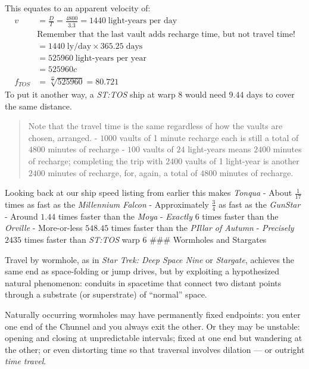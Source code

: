 \documentclass[
  letterpaper,
]{book}
\begin{document}
This equates to an apparent velocity of: \[
\begin{align}
v &= \frac{D}{T} = \frac{4800}{3.\overline{3}} = 1440\;\text{light-years per day} \\[0.5em]
&\text{Remember that the last vault adds recharge time, but not travel time!} \\[0.5em]
&= 1440\;\text{ly/day} \times 365.25\;\text{days} \\[0.5em]
&= 525960\;\text{light-years per year} \\[0.5em]
&= 525960c \\[1.5em]
f_{TOS} &= \sqrt[\frac{10}{3}]{525960} = 80.721
\end{align}
\] To put it another way, a \emph{ST:TOS} ship at warp \(8\) would need
\(9.44\) days to cover the same distance.

\begin{quote}
Note that the travel time is the same regardless of how the vaults are
chosen, arranged. - \(1000\) vaults of 1 minute recharge each is still a
total of \(4800\) minutes of recharge - \(100\) vaults of \(24\)
light-years means \(2400\) minutes of recharge; completing the trip with
\(2400\) vaults of 1 light-year is another \(2400\) minutes of recharge,
for, again, a total of \(4800\) minutes of recharge.
\end{quote}

Looking back at our ship speed listing from earlier this makes
\emph{Tonqua} - About \(\frac{1}{17}\) times as fast as the
\emph{Millennium Falcon} - Approximately \(\frac{3}{4}\) as fast as the
\emph{GunStar} - Around \(1.44\) times faster than the \emph{Moya} -
\emph{Exactly} \(6\) times faster than the \emph{Orville} - More-or-less
\(548.45\) times faster than the \emph{PIllar of Autumn} -
\emph{Precisely} \(2435\) times faster than \emph{ST:TOS} warp 6 \#\#\#
Wormholes and Stargates

Travel by wormhole, as in \emph{Star Trek: Deep Space Nine} or
\emph{Stargate}, achieves the same end as space-folding or jump drives,
but by exploiting a hypothesized natural phenomenon: conduits in
spacetime that connect two distant points through a substrate (or
superstrate) of ``normal'' space.

Naturally occurring wormholes may have permanently fixed endpoints: you
enter one end of the Chunnel and you always exit the other. Or they may
be unstable: opening and closing at unpredictable intervals; fixed at
one end but wandering at the other; or even distorting time so that
traversal involves dilation --- or outright \emph{time travel}.
\end{document}
